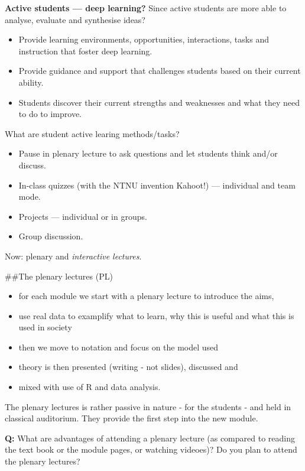 \documentclass[
  ignorenonframetext,
]{beamer}
\providecommand{\tightlist}{%
  \setlength{\itemsep}{0pt}\setlength{\parskip}{0pt}}
\begin{document}
\begin{frame}
\textbf{Active students --- deep learning?} Since active students are
more able to analyse, evaluate and synthesise ideas?

\begin{itemize}
\tightlist
\item
  Provide learning environments, opportunities, interactions, tasks and
  instruction that foster deep learning.
\item
  Provide guidance and support that challenges students based on their
  current ability.
\item
  Students discover their current strengths and weaknesses and what they
  need to do to improve.
\end{itemize}

What are student active learing methods/tasks?

\begin{itemize}
\tightlist
\item
  Pause in plenary lecture to ask questions and let students think
  and/or discuss.
\item
  In-class quizzes (with the NTNU invention Kahoot!) --- individual and
  team mode.
\item
  Projects --- individual or in groups.
\item
  Group discussion.
\end{itemize}

Now: plenary and \emph{interactive lectures}.
\end{frame}

\begin{frame}
\#\#The plenary lectures (PL)

\begin{itemize}
\tightlist
\item
  for each module we start with a plenary lecture to introduce the aims,
\item
  use real data to examplify what to learn, why this is useful and what
  this is used in society
\item
  then we move to notation and focus on the model used
\item
  theory is then presented (writing - not slides), discussed and
\item
  mixed with use of R and data analysis.
\end{itemize}

The plenary lectures is rather passive in nature - for the students -
and held in classical auditorium. They provide the first step into the
new module.

\textbf{Q:} What are advantages of attending a plenary lecture (as
compared to reading the text book or the module pages, or watching
videoes)? Do you plan to attend the plenary lectures?
\end{frame}
\end{document}
